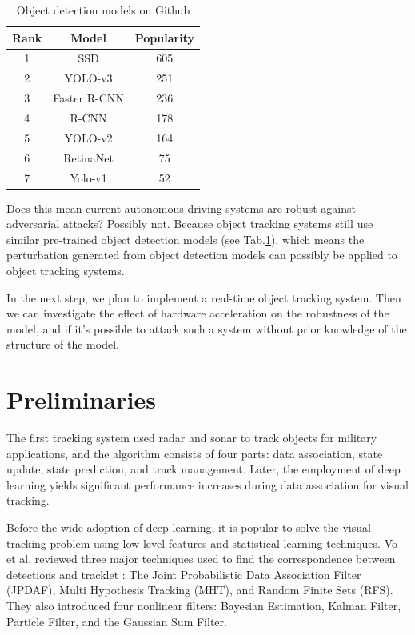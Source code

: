 \begin{table}[H]
\centering
\begin{tabular}{ ccc } 
\hline
Rank & Model & Popularity \\
\hline
1 & SSD & 605 \\ 
2 & YOLO-v3 & 251 \\ 
3 & Faster R-CNN & 236 \\ 
4 & R-CNN & 178 \\ 
5 & YOLO-v2 & 164 \\ 
6 & RetinaNet & 75 \\ 
7 & Yolo-v1 & 52 \\ 
\hline
\end{tabular}
\caption{Object detection models on Github  \cite{wang2021daedalus}}
\label{tab.detection_github}
\end{table}

Does this mean current autonomous driving systems are robust against adversarial attacks? Possibly not. Because object tracking systems still use similar pre-trained object detection models (see Tab.\ref{tab.detection_github}), which means the perturbation generated from object detection models can possibly be applied to object tracking systems.

In the next step, we plan to implement a real-time object tracking system. Then we can investigate the effect of hardware acceleration on the robustness of the model, and if it's possible to attack such a system without prior knowledge of the structure of the model.

\section{Preliminaries}
\label{sec:intro}

The first tracking system used radar and sonar to track objects for military applications, and the algorithm consists of four parts: data association, state update, state prediction, and track management. Later, the employment of deep learning yields significant performance increases during data association for visual tracking.

Before the wide adoption of deep learning, it is popular to solve the visual tracking problem using low-level features and statistical learning techniques. Vo et al. reviewed three major techniques used to find the correspondence between detections and tracklet \cite{vo2015multitarget}: The Joint Probabilistic Data Association Filter (JPDAF), Multi Hypothesis Tracking (MHT), and Random Finite Sets (RFS). They also introduced four nonlinear filters: Bayesian Estimation, Kalman Filter, Particle Filter, and the Gaussian Sum Filter.

